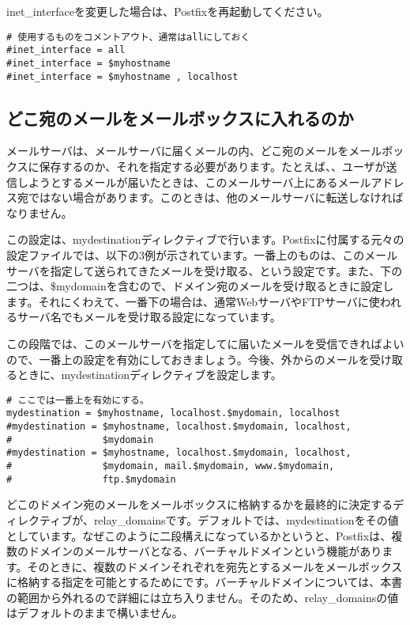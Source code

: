 inet\_interfaceを変更した場合は、Postfixを再起動してください。

\begin{lstlisting}[basicstyle=\ttfamily\footnotesize, frame=single]
# 使用するものをコメントアウト、通常はallにしておく
#inet_interface = all
#inet_interface = $myhostname
#inet_interface = $myhostname , localhost
\end{lstlisting}


\subsection{どこ宛のメールをメールボックスに入れるのか}
メールサーバは、メールサーバに届くメールの内、どこ宛のメールをメールボックスに保存するのか、それを指定する必要があります。たとえば、、ユーザが送信しようとするメールが届いたときは、このメールサーバ上にあるメールアドレス宛ではない場合があります。このときは、他のメールサーバに転送しなければなりません。

この設定は、mydestinationディレクティブで行います。Postfixに付属する元々の設定ファイルでは、以下の3例が示されています。一番上のものは、このメールサーバを指定して送られてきたメールを受け取る、という設定です。また、下の二つは、\$mydomainを含むので、ドメイン宛のメールを受け取るときに設定します。それにくわえて、一番下の場合は、通常WebサーバやFTPサーバに使われるサーバ名でもメールを受け取る設定になっています。

この段階では、このメールサーバを指定してに届いたメールを受信できればよいので、一番上の設定を有効にしておきましょう。今後、外からのメールを受け取るときに、mydestinationディレクティブを設定します。

\begin{lstlisting}[basicstyle=\ttfamily\footnotesize, frame=single]
# ここでは一番上を有効にする。
mydestination = $myhostname, localhost.$mydomain, localhost
#mydestination = $myhostname, localhost.$mydomain, localhost,
#                $mydomain
#mydestination = $myhostname, localhost.$mydomain, localhost, 
#                $mydomain, mail.$mydomain, www.$mydomain, 
#                ftp.$mydomain
\end{lstlisting}

どこのドメイン宛のメールをメールボックスに格納するかを最終的に決定するディレクティブが、relay\_domainsです。デフォルトでは、mydestinationをその値としています。なぜこのように二段構えになっているかというと、Postfixは、複数のドメインのメールサーバとなる、バーチャルドメインという機能があります。そのときに、複数のドメインそれぞれを宛先とするメールをメールボックスに格納する指定を可能とするためにです。バーチャルドメインについては、本書の範囲から外れるので詳細には立ち入りません。そのため、relay\_domainsの値はデフォルトのままで構いません。


